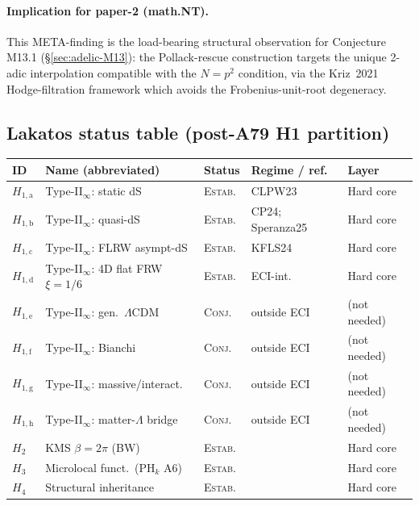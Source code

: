 \documentclass[a4paper,11pt]{article}
\theoremstyle{definition}
\theoremstyle{remark}
\begin{document}
\paragraph{Implication for paper-2 (math.NT).}
This META-finding is the load-bearing structural observation for
Conjecture M13.1 (\S\ref{sec:adelic-M13}): the Pollack-rescue
construction targets the unique 2-adic interpolation compatible
with the $N=p^{2}$ condition, via the Kriz~2021 Hodge-filtration
framework which avoids the Frobenius-unit-root degeneracy.

\subsection{Lakatos status table (post-A79 H1 partition)}
\label{sec:axioms-lakatos}

\begin{table}[ht]
\centering
\small
\setlength{\tabcolsep}{3.5pt}
\begin{tabular}{lllll}
\toprule
ID & Name (abbreviated) & Status & Regime / ref. & Layer \\
\midrule
$H_{1,\mathrm{a}}$ & Type-II$_\infty$: static dS
  & \textsc{Estab.} & CLPW23 \cite{CLPW23} & Hard core \\
$H_{1,\mathrm{b}}$ & Type-II$_\infty$: quasi-dS
  & \textsc{Estab.} & CP24; Speranza25 & Hard core \\
$H_{1,\mathrm{c}}$ & Type-II$_\infty$: FLRW asympt-dS
  & \textsc{Estab.} & KFLS24 \cite{KFLS24} & Hard core \\
$H_{1,\mathrm{d}}$ & Type-II$_\infty$: 4D flat FRW $\xi{=}1/6$
  & \textsc{Estab.} & ECI-int.\ \cite{FRWnote} & Hard core \\
$H_{1,\mathrm{e}}$ & Type-II$_\infty$: gen.\ $\Lambda$CDM
  & \textsc{Conj.} & outside ECI & (not needed) \\
$H_{1,\mathrm{f}}$ & Type-II$_\infty$: Bianchi
  & \textsc{Conj.} & outside ECI & (not needed) \\
$H_{1,\mathrm{g}}$ & Type-II$_\infty$: massive/interact.
  & \textsc{Conj.} & outside ECI & (not needed) \\
$H_{1,\mathrm{h}}$ & Type-II$_\infty$: matter-$\Lambda$ bridge
  & \textsc{Conj.} & outside ECI & (not needed) \\
\midrule
$H_2$ & KMS $\beta{=}2\pi$ (BW) & \textsc{Estab.} & & Hard core \\
$H_3$ & Microlocal funct.\ (PH$_k$ A6) & \textsc{Estab.} & & Hard core \\
$H_4$ & Structural inheritance & \textsc{Estab.} & & Hard core \\

\end{tabular}
\end{table}
\end{document}
